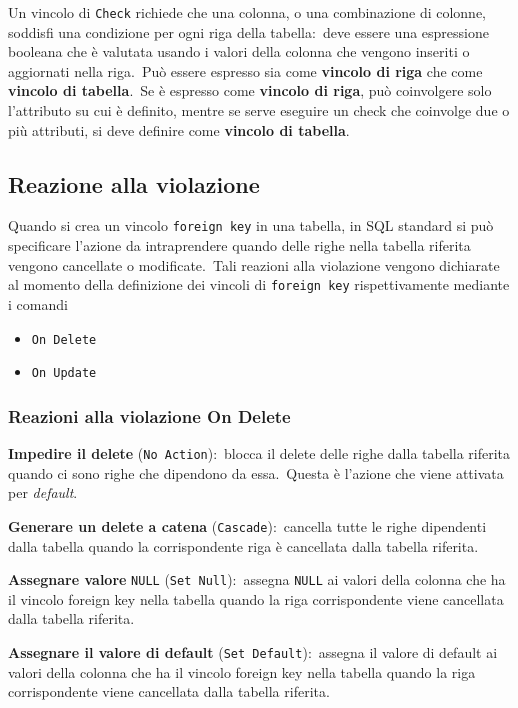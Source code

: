 Un vincolo di \texttt{Check} richiede che una colonna, o una combinazione di colonne, soddisfi una condizione per ogni riga della tabella:\ deve essere una espressione booleana che è valutata usando i valori della colonna che vengono inseriti o aggiornati nella riga.\
Può essere espresso sia come \textbf{vincolo di riga} che come \textbf{vincolo di tabella}.\
Se è espresso come \textbf{vincolo di riga}, può coinvolgere solo l'attributo su cui è definito, mentre se serve eseguire un check che coinvolge due o più attributi, si deve definire come \textbf{vincolo di tabella}.

\subsection{Reazione alla violazione}

Quando si crea un vincolo \texttt{foreign key} in una tabella, in SQL standard si può specificare l'azione da intraprendere quando delle righe nella tabella riferita vengono cancellate o modificate.\
Tali reazioni alla violazione vengono dichiarate al momento della definizione dei vincoli di \texttt{foreign key} rispettivamente mediante i comandi
\begin{itemize}
	\item \texttt{On Delete}
	\item \texttt{On Update}
\end{itemize}

\subsubsection{Reazioni alla violazione On Delete}

\textbf{Impedire il delete} (\texttt{No Action}):\ blocca il delete delle righe dalla tabella riferita quando ci sono righe che dipendono da essa.\
Questa è l'azione che viene attivata per \textit{default}.

\noindent \textbf{Generare un delete a catena} (\texttt{Cascade}):\
cancella tutte le righe dipendenti dalla tabella quando la corrispondente riga è cancellata dalla tabella riferita.\

\noindent \textbf{Assegnare valore} \texttt{NULL} (\texttt{Set Null}):\ assegna \texttt{NULL} ai valori della colonna che ha il vincolo foreign key nella tabella quando la riga corrispondente viene cancellata dalla tabella riferita.

\noindent \textbf{Assegnare il valore di default} (\texttt{Set Default}):\ assegna il valore di default ai valori della colonna che ha il vincolo foreign key nella tabella quando la riga corrispondente viene cancellata dalla tabella riferita.

